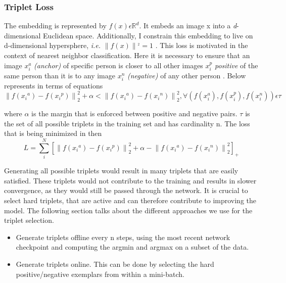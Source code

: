 \documentclass[a4paper,12pt, twoside]{NITKReport}
\begin{document}
\subsubsection{Triplet Loss}
\par The embedding is represented by $ f(x) \epsilon \mathbb{R}^{d}$. It embeds an image x into a \textit{d}-dimensional Euclidean space. Additionally, I constrain this embedding to live on d-dimensional hypersphere, \textit{i.e.} $\left \|f(x)  \right \|^{_{2}} =1$ . This loss is motivated in the context of nearest neighbor classification. Here it is necessary to ensure that an image $x_{i}^{a}$ \textit{(anchor)} of specific person is closer to all other images $x_{i}^{p}$ \textit{positive} of the same person than it is to any image $x_{i}^{n}$ \textit{(negative)} of any other person \cite{schroff2015facenet}. Below represents in terms of equations
\begin{equation}
\left \| f(x{_{i}}^{a})-f(x{_{i}}^{p})\right \|_{2}^{2} + \alpha < \left \| f(x{_{i}}^{a})-f(x{_{i}}^{n})\right \|_{2}^{2}, \forall (f(x_{i}^{a}),f(x_{i}^{p}),f(x_{i}^{n}))\epsilon \tau 
\end{equation}

where $\alpha$ is the margin that is enforced between positive and negative pairs.
$\tau$ is the set of all possible triplets in the training set and has cardinality n. The loss that is being minimized in then 
\begin{equation}
L = \sum_{i}^{N}[\left \| f(x{_{i}}^{a})-f(x{_{i}}^{p})\right \|_{2}^{2} + \alpha - \left \| f(x{_{i}}^{a})-f(x{_{i}}^{n})\right \|_{2}^{2}]_{+}
\end{equation}

Generating all possible triplets would result in many triplets that are easily satisfied. These triplets would not contribute to the training and results in slower convergence, as they would still be passed  through the network.  It is crucial to select hard triplets, that are active and can therefore contribute to improving the model.  The following section talks about the different approaches we use for the triplet selection.
\begin{itemize}
\item Generate triplets offline every n steps, using the most recent network checkpoint and computing the argmin and argmax on a subset of the data.
\item Generate triplets online.  This can be done by selecting the hard positive/negative exemplars from within a mini-batch.
\end{itemize}
\end{document}
